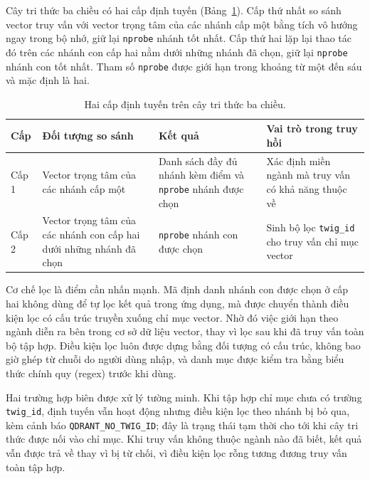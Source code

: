 Cây tri thức ba chiều có hai cấp định tuyến (Bảng~\ref{tab:hai-cap-dinh-tuyen}). Cấp thứ nhất so sánh vector truy vấn với vector trọng tâm của các nhánh cấp một bằng tích vô hướng ngay trong bộ nhớ, giữ lại \texttt{nprobe} nhánh tốt nhất. Cấp thứ hai lặp lại thao tác đó trên các nhánh con cấp hai nằm dưới những nhánh đã chọn, giữ lại \texttt{nprobe} nhánh con tốt nhất. Tham số \texttt{nprobe} được giới hạn trong khoảng từ một đến sáu và mặc định là hai.

\begin{table}[htbp]
    \centering
    \caption{Hai cấp định tuyến trên cây tri thức ba chiều.}
    \label{tab:hai-cap-dinh-tuyen}
    \small
    \begin{tabularx}{\textwidth}{@{}>{\raggedright\arraybackslash}p{1.4cm}>{\raggedright\arraybackslash}p{4.6cm}>{\raggedright\arraybackslash}p{4.6cm}>{\raggedright\arraybackslash}X@{}}
        \toprule
        \textbf{Cấp} & \textbf{Đối tượng so sánh} & \textbf{Kết quả} & \textbf{Vai trò trong truy hồi} \\
        \midrule
        Cấp 1 & Vector trọng tâm của các nhánh cấp một & Danh sách đầy đủ nhánh kèm điểm và \texttt{nprobe} nhánh được chọn & Xác định miền ngành mà truy vấn có khả năng thuộc về \\
        Cấp 2 & Vector trọng tâm của các nhánh con cấp hai dưới những nhánh đã chọn & \texttt{nprobe} nhánh con được chọn & Sinh bộ lọc \texttt{twig\_id} cho truy vấn chỉ mục vector \\
        \bottomrule
    \end{tabularx}
\end{table}

Cơ chế lọc là điểm cần nhấn mạnh. Mã định danh nhánh con được chọn ở cấp hai không dùng để tự lọc kết quả trong ứng dụng, mà được chuyển thành điều kiện lọc có cấu trúc truyền xuống chỉ mục vector. Nhờ đó việc giới hạn theo ngành diễn ra bên trong cơ sở dữ liệu vector, thay vì lọc sau khi đã truy vấn toàn bộ tập hợp. Điều kiện lọc luôn được dựng bằng đối tượng có cấu trúc, không bao giờ ghép từ chuỗi do người dùng nhập, và danh mục được kiểm tra bằng biểu thức chính quy (regex) trước khi dùng.

Hai trường hợp biên được xử lý tường minh. Khi tập hợp chỉ mục chưa có trường \texttt{twig\_id}, định tuyến vẫn hoạt động nhưng điều kiện lọc theo nhánh bị bỏ qua, kèm cảnh báo \texttt{QDRANT\_NO\_TWIG\_ID}; đây là trạng thái tạm thời cho tới khi cây tri thức được nối vào chỉ mục. Khi truy vấn không thuộc ngành nào đã biết, kết quả vẫn được trả về thay vì bị từ chối, vì điều kiện lọc rỗng tương đương truy vấn toàn tập hợp.

